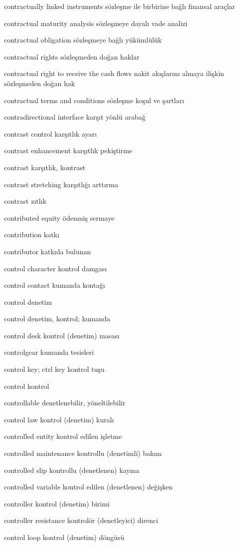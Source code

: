 \documentclass[12pt,fleqn]{article}\usepackage{../../common}
\begin{document}
contractually linked instruments sözleşme ile birbirine bağlı finansal araçlar

contractual maturity analysis sözleşmeye dayalı vade analizi

contractual obligation sözleşmeye bağlı yükümlülük

contractual rights sözleşmeden doğan haklar

contractual right to receive the cash flows nakit akışlarını almaya ilişkin sözleşmeden doğan hak

contractual terms and conditions sözleşme koşul ve şartları

contradirectional interface karşıt yönlü arabağ

contrast control karşıtlık ayarı

contrast enhancement karşıtlık pekiştirme

contrast karşıtlık, kontrast

contrast stretching karşıtlığı arttırma

contrast zıtlık

contributed equity ödenmiş sermaye

contribution katkı

contributor katkıda bulunan

control character kontrol damgası

control contact kumanda kontağı

control denetim

control denetim, kontrol; kumanda

control desk kontrol (denetim) masası

controlgear kumanda tesisleri

control key; ctrl key kontrol tuşu

control kontrol

controllable denetlenebilir, yöneltilebilir

control law kontrol (denetim) kuralı

controlled entity kontrol edilen işletme

controlled maintenance kontrollu (denetimli) bakım

controlled slip kontrollu (denetlenen) kayma

controlled variable kontrol edilen (denetlenen) değişken

controller kontrol (denetim) birimi

controller resistance kontrolör (denetleyici) direnci

control loop kontrol (denetim) döngüsü
\end{document}
